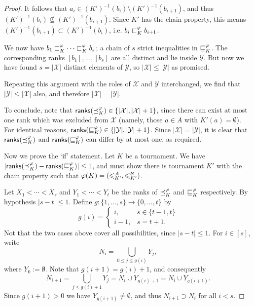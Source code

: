 \begin{proof}
    It follows that $a_i \in (K')^{-1}(b_i) \setminus (K')^{-1}(b_{i+1})$, and
    thus $(K')^{-1}(b_i) \not\subseteq (K')^{-1}(b_{i+1})$. Since $K'$ has
    the chain property, this means $(K')^{-1}(b_{i+1}) \subset
    (K')^{-1}(b_i)$, i.e. $b_i \sqsubset_K^\varphi b_{i+1}$.

    We now have $b_1 \sqsubset_K^\varphi \cdots \sqsubset_K^\varphi b_s$; a chain of $s$ strict
    inequalities in $\sqsubseteq_K^\varphi$. The corresponding ranks $[b_1], \ldots,
    [b_s]$ are all distinct and lie inside $\mathcal{Y}$. But now we have found
    $s = |\mathcal{X}|$ distinct elements of $\mathcal{Y}$, so $|\mathcal{X}|
    \le |\mathcal{Y}|$ as promised.

    Repeating this argument with the roles of $\mathcal{X}$ and $\mathcal{Y}$
    interchanged, we find that $|\mathcal{Y}| \le |\mathcal{X}|$ also, and
    therefore $|\mathcal{X}| = |\mathcal{Y}|$.

    To conclude, note that $\mathsf{ranks}({\preceq_K^\varphi}) \in \{|\mathcal{X}|,
    |\mathcal{X}| + 1\}$, since there can exist at most one rank which was
    excluded from $\mathcal{X}$ (namely, those $a \in A$ with $K'(a) =
    \emptyset$). For identical reasons, $\mathsf{ranks}({\sqsubseteq_K^\varphi}) \in
    \{|\mathcal{Y}|, |\mathcal{Y}| + 1\}$. Since $|\mathcal{X}| =
    |\mathcal{Y}|$, it is clear that $\mathsf{ranks}({\preceq_K^\varphi})$ and
    $\mathsf{ranks}({\sqsubseteq_K^\varphi})$ can differ by at most one, as required.

    Now we prove the `if' statement. Let $K$ be a tournament. We have
    $|\mathsf{ranks}({\preceq_K^\varphi}) - \mathsf{ranks}({\sqsubseteq_K^\varphi})| \le 1$, and must show there is
    tournament $K'$ with the chain property such that $\varphi(K) = ({\leqslant^{\mathcal{A}}_{K'}},
    {\leqslant^{\mathcal{B}}_{K'}})$.

    Let $X_1 < \cdots < X_s$ and $Y_1 < \cdots < Y_t$ be the ranks of
    $\preceq_K^\varphi$ and $\sqsubseteq_K^\varphi$ respectively. By hypothesis $|s - t| \le
    1$. Define $g: \{1,\ldots,s\} \to \{0,\ldots,t\}$ by
    \[
        g(i) = \begin{cases}
            i,& s \in \{t-1, t\} \\
            i - 1,& s = t + 1.
        \end{cases}
    \]
    Not that the two cases above cover all possibilities, since $|s - t| \le
    1$. For $i \in [s]$, write
    \[
        N_i = \bigcup_{0 \le j \le g(i)}{Y_j},
    \]
    where $Y_0 := \emptyset$. Note that $g(i+1) = g(i) + 1$, and consequently
    \[
        N_{i+1}
        = \bigcup_{j \le g(i) + 1}{Y_j}
        = N_i \cup Y_{g(i) + 1}
        = N_i \cup Y_{g(i + 1)}.
    \]
    Since $g(i+1) > 0$ we have $Y_{g(i+1)} \ne \emptyset$, and thus $N_{i+1}
    \supset N_i$ for all $i < s$.


\end{proof}
